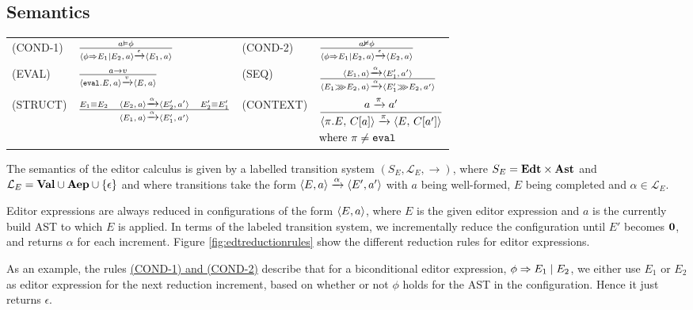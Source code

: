 \subsection{Semantics}

\begin{figure*}
  \center
  \renewcommand{\arraystretch}{2}
  \begin{tabular}{llll}
    \scriptsize(COND-1)  & $ \CondOne $           & \scriptsize(COND-2) & $ \CondTwo$ \\
    \scriptsize(EVAL)    & $ \Eval $              & \scriptsize(SEQ)    & $ \Seq$     \\
    \scriptsize(STRUCT)  & $\Struct$              & \scriptsize(CONTEXT)& \scriptsize$\Context$
  \end{tabular}
  \caption{Editor Expression reduction rules}
  \label{fig:edtreductionrules}
\end{figure*}

The semantics of the editor calculus is given by a labelled transition system
$(S_E, \mathcal{L}_E, \to)$, where $S_E = \edt \times \AST$ and $\mathcal{L}_E
= \val \cup \aep \cup \{\epsilon\}$ and where transitions take the form
$\breakpoint{E, a} \transition{$\alpha$} \breakpoint{E', a'}$ with $a$ being
well-formed, $E$ being completed and $\alpha \in \mathcal{L}_E$. 

Editor expressions are always reduced in configurations of the form
$\breakpoint{E,a}$, where $E$ is the given editor expression and $a$ is the
currently build AST to which $E$ is applied. In terms of the labeled
transition system, we incrementally reduce the configuration until $E'$ becomes
$\nil$, and returns $\alpha$ for each increment. Figure
\ref{fig:edtreductionrules} show the different reduction rules for editor
expressions.

As an example, the rules \hyperref[fig:edtreductionrules]{(COND-1) and (COND-2)} describe that
for a biconditional editor expression, $\bicond{\phi}{E_1}{E_2}$, we either use
$E_1$ or $E_2$ as editor expression for the next reduction increment, based on
whether or not $\phi$ holds for the AST in the configuration. Hence it just
returns $\epsilon$. 

